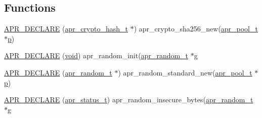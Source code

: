 \subsection*{Functions}
\begin{DoxyCompactItemize}
\item 
\hyperlink{group__apr__random_ga198e0e695921706b8452432b40a48678}{A\+P\+R\+\_\+\+D\+E\+C\+L\+A\+RE} (\hyperlink{structapr__crypto__hash__t}{apr\+\_\+crypto\+\_\+hash\+\_\+t} $\ast$) apr\+\_\+crypto\+\_\+sha256\+\_\+new(\hyperlink{structapr__pool__t}{apr\+\_\+pool\+\_\+t} $\ast$\hyperlink{group__APACHE__CORE__MPM_ga5cd91701e5c167f2b1a38e70ab57817e}{p})
\item 
\hyperlink{group__apr__random_ga0beeda9af106148755f0dde71aea6c93}{A\+P\+R\+\_\+\+D\+E\+C\+L\+A\+RE} (\hyperlink{group__MOD__ISAPI_gacd6cdbf73df3d9eed42fa493d9b621a6}{void}) apr\+\_\+random\+\_\+init(\hyperlink{structapr__random__t}{apr\+\_\+random\+\_\+t} $\ast$\hyperlink{NON-AUTOTOOLS-BUILD_8txt_a50403b1fefb03c2a6080e2d29aa9a2c4}{g}
\item 
\hyperlink{group__apr__random_ga7a5815c3aa0c70a34fe428af0dee40bb}{A\+P\+R\+\_\+\+D\+E\+C\+L\+A\+RE} (\hyperlink{structapr__random__t}{apr\+\_\+random\+\_\+t} $\ast$) apr\+\_\+random\+\_\+standard\+\_\+new(\hyperlink{structapr__pool__t}{apr\+\_\+pool\+\_\+t} $\ast$\hyperlink{group__APACHE__CORE__MPM_ga5cd91701e5c167f2b1a38e70ab57817e}{p})
\item 
\hyperlink{group__apr__random_ga07682b862eda9e40f1d8c1377514b5ac}{A\+P\+R\+\_\+\+D\+E\+C\+L\+A\+RE} (\hyperlink{group__apr__errno_gaa5105fa83cc322f09382292db8b47593}{apr\+\_\+status\+\_\+t}) apr\+\_\+random\+\_\+insecure\+\_\+bytes(\hyperlink{structapr__random__t}{apr\+\_\+random\+\_\+t} $\ast$\hyperlink{NON-AUTOTOOLS-BUILD_8txt_a50403b1fefb03c2a6080e2d29aa9a2c4}{g}
\end{DoxyCompactItemize}
